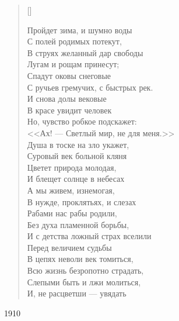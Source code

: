 \settowidth{\versewidth}{В струях желанный дар свободы}
\begin{verse}[\versewidth]
\begin{altverse}
Пройдет зима, и шумно воды\\
    С полей родимых потекут,\\
В струях желанный дар свободы\\
    Лугам и рощам принесут;\\
Спадут оковы снеговые\\
    С ручьев гремучих, с быстрых рек.\\
И снова долы вековые\\
    В красе увидит человек\ldotst\\
Но, чувство робкое подскажет:\\
    <<Ах! --- Светлый мир, не для меня.>>\\
Душа в тоске на зло укажет,\\
    Суровый век больной кляня\ldotst\\
Цветет природа молодая,\\
    И блещет солнце в небесах\ldotst\\
А мы живем, изнемогая,\\
    В нужде, проклятьях, и слезах\ldotst\\
Рабами нас рабы родили,\\
    Без духа пламенной борьбы,\\
И с детства ложный страх вселили\\
    Перед величием судьбы\ldotst\\
В цепях неволи век томиться,\\
    Всю жизнь безропотно страдать,\\
Слепыми быть и лжи молиться,\\
    И, не расцветши --- увядать\ldotst
\end{altverse}
\end{verse}
1910



